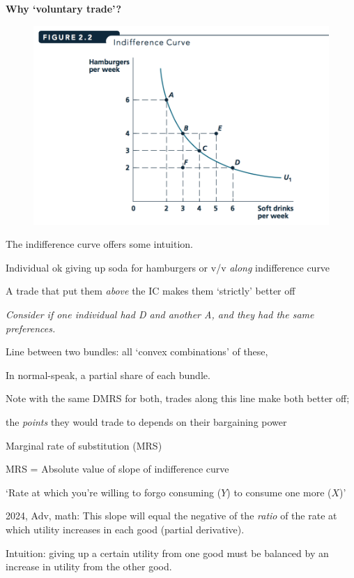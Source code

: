 \documentclass[table]{beamer}
\begin{document}
\begin{frame}

\textbf{Why `voluntary trade'? }

\begin{figure}

{\centering \includegraphics[width=0.8\linewidth]{picsfigs/indifccurve} 

}

\end{figure}

The indifference curve offers some intuition.

Individual ok giving up soda for hamburgers or v/v \emph{along}
indifference curve

A trade that put them \emph{above} the IC makes them `strictly' better
off

\emph{Consider if one individual had D and another A, and they had the
same preferences.}

Line between two bundles: all `convex combinations' of these,

In normal-speak, a partial share of each bundle.

Note with the same DMRS for both, trades along this line make both
better off;

the \emph{points} they would trade to depends on their bargaining power

\end{frame}

\begin{frame}{Marginal rate of substitution (MRS)}
\protect\hypertarget{marginal-rate-of-substitution-mrs}{}

MRS = Absolute value of slope of indifference curve

\bigskip

`Rate at which you're willing to forgo consuming (\(Y\)) to consume one
more (\(X\))'

2024, Adv, math: This slope will equal the negative of the \emph{ratio}
of the rate at which utility increases in each good (partial
derivative).

Intuition: giving up a certain utility from one good must be balanced by
an increase in utility from the other good.

\end{frame}
\end{document}
